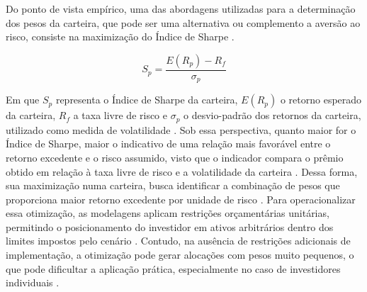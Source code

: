Do ponto de vista empírico, uma das abordagens utilizadas para a determinação dos pesos da carteira, que pode ser uma alternativa ou complemento a aversão ao risco, consiste na maximização do Índice de Sharpe \cite{jeleskovic2024cryptocurrency}. 

\begin{equation}
    S_p = \frac{E(R_p) - R_f}{\sigma_p}
    \label{eq:indice_sharpe}
\end{equation}

Em que \(S_p\) representa o Índice de Sharpe da carteira, \(E(R_p)\) o retorno esperado da carteira, \(R_f\) a taxa livre de risco e \(\sigma_p\) o desvio-padrão dos retornos da carteira, utilizado como medida de volatilidade \cite{lorenzo2023online}. Sob essa perspectiva, quanto maior for o Índice de Sharpe, maior o indicativo de uma relação mais favorável entre o retorno excedente e o risco assumido, visto que o indicador compara o prêmio obtido em relação à taxa livre de risco e a volatilidade da carteira \cite{lorenzo2023online}. Dessa forma, sua maximização numa carteira, busca identificar a combinação de pesos que proporciona maior retorno excedente por unidade de risco \cite{bakry2021bitcoin,jeleskovic2024cryptocurrency,demosthenous2026portfolio}. Para operacionalizar essa otimização, as modelagens aplicam restrições orçamentárias unitárias, permitindo o posicionamento do investidor em ativos arbitrários dentro dos limites impostos pelo cenário \cite{bakry2021bitcoin}. Contudo, na ausência de restrições adicionais de implementação, a otimização pode gerar alocações com pesos muito pequenos, o que pode dificultar a aplicação prática, especialmente no caso de investidores individuais \cite{chaweewanchon2022markowitz}.
